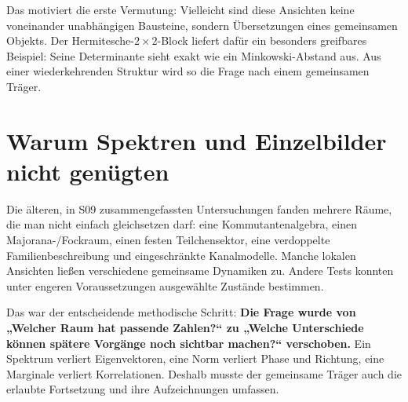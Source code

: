 Das motiviert die erste Vermutung: Vielleicht sind diese Ansichten keine voneinander unabhängigen Bausteine, sondern Übersetzungen eines gemeinsamen Objekts. Der Hermitesche-$2\times2$-Block liefert dafür ein besonders greifbares Beispiel: Seine Determinante sieht exakt wie ein Minkowski-Abstand aus. Aus einer wiederkehrenden Struktur wird so die Frage nach einem gemeinsamen Träger. 

\section{Warum Spektren und Einzelbilder nicht genügten}
Die älteren, in S09 zusammengefassten Untersuchungen fanden mehrere Räume, die man nicht einfach gleichsetzen darf: eine Kommutantenalgebra, einen Majorana-/Fockraum, einen festen Teilchensektor, eine verdoppelte Familienbeschreibung und eingeschränkte Kanalmodelle. Manche lokalen Ansichten ließen verschiedene gemeinsame Dynamiken zu. Andere Tests konnten unter engeren Voraussetzungen ausgewählte Zustände bestimmen.

Das war der entscheidende methodische Schritt: \textbf{Die Frage wurde von „Welcher Raum hat passende Zahlen?“ zu „Welche Unterschiede können spätere Vorgänge noch sichtbar machen?“ verschoben.} Ein Spektrum verliert Eigenvektoren, eine Norm verliert Phase und Richtung, eine Marginale verliert Korrelationen. Deshalb musste der gemeinsame Träger auch die erlaubte Fortsetzung und ihre Aufzeichnungen umfassen.

